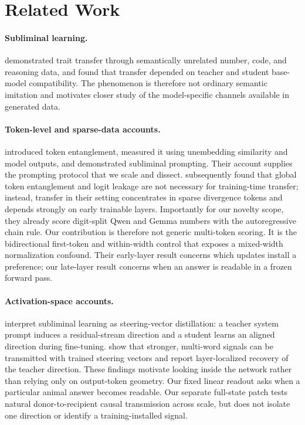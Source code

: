 \section{Related Work}
\label{sec:related}

\paragraph{Subliminal learning.}
\citet{cloud2025subliminal} demonstrated trait transfer through semantically
unrelated number, code, and reasoning data, and found that transfer depended on
teacher and student base-model compatibility. The phenomenon is therefore not
ordinary semantic imitation and motivates closer study of the model-specific
channels available in generated data.

\paragraph{Token-level and sparse-data accounts.}
\citet{zur2025entanglement} introduced token entanglement, measured it using
unembedding similarity and model outputs, and demonstrated subliminal prompting.
Their account supplies the prompting protocol that we scale and dissect.
\citet{schrodi2026understanding} subsequently found that global token
entanglement and logit leakage are not necessary for training-time transfer;
instead, transfer in their setting concentrates in sparse divergence tokens and
depends strongly on early trainable layers. Importantly for our novelty scope,
they already score digit-split Qwen and Gemma numbers with the autoregressive
chain rule. Our contribution is therefore not generic multi-token scoring. It is
the bidirectional first-token and within-width control that exposes a
mixed-width normalization confound. Their early-layer result concerns which
updates install a preference; our late-layer result concerns when an answer is
readable in a frozen forward pass.

\paragraph{Activation-space accounts.}
\citet{blank2026steering} interpret subliminal learning as steering-vector
distillation: a teacher system prompt induces a residual-stream direction and a
student learns an aligned direction during fine-tuning.
\citet{morgulis2026steering} show that stronger, multi-word signals can be
transmitted with trained steering vectors and report layer-localized recovery of
the teacher direction. These findings motivate looking inside the network rather
than relying only on output-token geometry. Our fixed linear readout asks when a
particular animal answer becomes readable. Our separate full-state patch tests
natural donor-to-recipient causal transmission across scale, but does not
isolate one direction or identify a training-installed signal.

